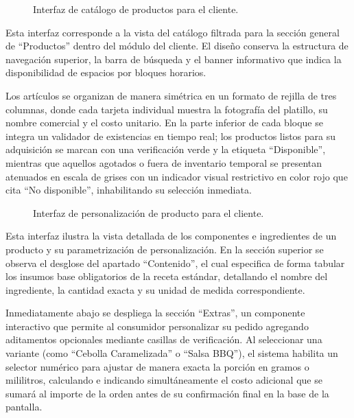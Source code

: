 \begin{figure}[H]
    \centering
    
    \caption{Interfaz de catálogo de productos para el cliente.}
    \label{fig:ui-cli-06}
\end{figure}

Esta interfaz corresponde a la vista del catálogo filtrada para la sección general de ``Productos'' dentro del módulo del cliente. El diseño conserva la estructura de navegación superior, la barra de búsqueda y el banner informativo que indica la disponibilidad de espacios por bloques horarios.

Los artículos se organizan de manera simétrica en un formato de rejilla de tres columnas, donde cada tarjeta individual muestra la fotografía del platillo, su nombre comercial y el costo unitario. En la parte inferior de cada bloque se integra un validador de existencias en tiempo real; los productos listos para su adquisición se marcan con una verificación verde y la etiqueta ``Disponible'', mientras que aquellos agotados o fuera de inventario temporal se presentan atenuados en escala de grises con un indicador visual restrictivo en color rojo que cita ``No disponible'', inhabilitando su selección inmediata.

\begin{figure}[H]
    \centering
    
    \caption{Interfaz de personalización de producto para el cliente.}
    \label{fig:ui-cli-07}
\end{figure}

Esta interfaz ilustra la vista detallada de los componentes e ingredientes de un producto y su parametrización de personalización. En la sección superior se observa el desglose del apartado ``Contenido'', el cual especifica de forma tabular los insumos base obligatorios de la receta estándar, detallando el nombre del ingrediente, la cantidad exacta y su unidad de medida correspondiente.

Inmediatamente abajo se despliega la sección ``Extras'', un componente interactivo que permite al consumidor personalizar su pedido agregando aditamentos opcionales mediante casillas de verificación. Al seleccionar una variante (como ``Cebolla Caramelizada'' o ``Salsa BBQ''), el sistema habilita un selector numérico para ajustar de manera exacta la porción en gramos o mililitros, calculando e indicando simultáneamente el costo adicional que se sumará al importe de la orden antes de su confirmación final en la base de la pantalla.

